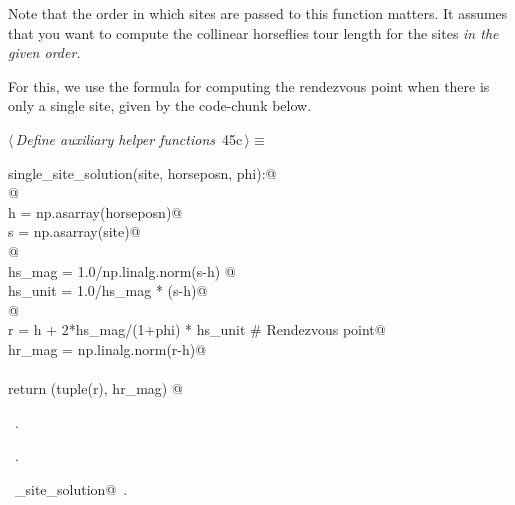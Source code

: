 \documentclass[11.5pt]{report}
\begin{document}
Note that the order in which sites are passed to this function matters. It 
assumes that you want to compute the collinear horseflies tour length for the 
sites \textit{in the given order.} 

For this, we use the formula for computing the rendezvous point when there is 
only a single site, given by the code-chunk below. 


\begin{flushleft} \small\label{scrap64}\raggedright\small
{} $\langle\,${\itshape Define auxiliary helper functions}\nobreak\ {\footnotesize {45c}}$\,\rangle\equiv$
\vspace{-1ex}
\begin{list}{}{} \item
\mbox{}\verb@def single_site_solution(site, horseposn, phi):@\\
\mbox{}\verb@     @\\
\mbox{}\verb@     h = np.asarray(horseposn)@\\
\mbox{}\verb@     s = np.asarray(site)@\\
\mbox{}\verb@     @\\
\mbox{}\verb@     hs_mag  = 1.0/np.linalg.norm(s-h) @\\
\mbox{}\verb@     hs_unit = 1.0/hs_mag * (s-h)@\\
\mbox{}\verb@     @\\
\mbox{}\verb@     r      = h +  2*hs_mag/(1+phi) * hs_unit # Rendezvous point@\\
\mbox{}\verb@     hr_mag = np.linalg.norm(r-h)@\\
\mbox{}\verb@@\\
\mbox{}\verb@     return (tuple(r), hr_mag) @\\
\mbox{}\verb@@{\NWsep}
\end{list}
\vspace{-1.5ex}
\footnotesize
\begin{list}{}{\setlength{\itemsep}{-\parsep}\setlength{\itemindent}{-\leftmargin}}
\item \NWtxtMacroDefBy\ .
\item \NWtxtMacroRefIn\ .
\item \NWtxtIdentsDefed\nobreak\  \verb@single_site_solution@\nobreak\ .
\item{}
\end{list}
\vspace{4ex}
\end{flushleft}
\end{document}
